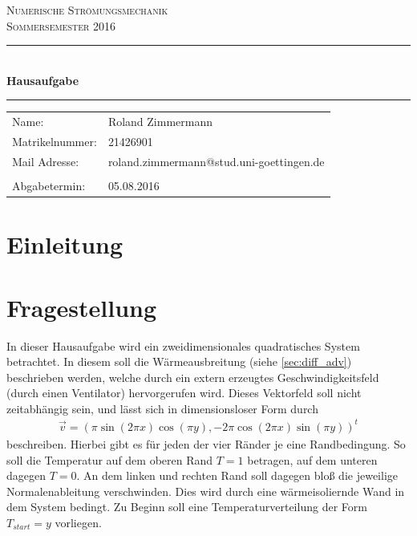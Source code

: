 \documentclass[12pt,a4paper,titlepage,headinclude,bibtotoc]{scrartcl}
\begin{document}
\begin{titlepage}
\centering
\textsc{\Large Numerische Strömungsmechanik\\
[1.5ex] Sommersemester 2016}

\vspace*{4.2cm}

\rule{\textwidth}{1pt}\\[0.5cm]
{\huge \bfseries
  Hausaufgabe\\[1.5ex]}
\rule{\textwidth}{1pt}

\vspace*{3.5cm}

\begin{Large}
\begin{tabular}{ll}
Name: & Roland Zimmermann\\
Matrikelnummer:	& 21426901 \\
Mail Adresse: & roland.zimmermann@stud.uni-goettingen.de \\ 
\\
Abgabetermin: & 05.08.2016\\
\end{tabular}
\end{Large}

\end{titlepage}



\tableofcontents

\newpage

\section{Einleitung}
\label{sec:einleitung}

\section{Fragestellung}
\label{sec:fragestellung}
In dieser Hausaufgabe wird ein zweidimensionales quadratisches System betrachtet. In diesem soll die Wärmeausbreitung (siehe \ref{sec:diff_adv}) beschrieben werden, welche durch ein extern erzeugtes Geschwindigkeitsfeld (durch einen Ventilator) hervorgerufen wird. Dieses Vektorfeld soll nicht zeitabhängig sein, und lässt sich in dimensionsloser Form durch
\begin{align*}
\vec{v} = (\pi \sin(2\pi x) \cos(\pi y), -2 \pi \cos(2\pi x) \sin(\pi y))^t
\end{align*}
beschreiben. Hierbei gibt es für jeden der vier Ränder je eine Randbedingung. So soll die Temperatur auf dem oberen Rand $T=1$ betragen, auf dem unteren dagegen $T=0$. An dem linken und rechten Rand soll dagegen bloß die jeweilige Normalenableitung verschwinden. Dies wird durch eine wärmeisoliernde Wand in dem System bedingt. Zu Beginn soll eine Temperaturverteilung der Form $T_{start} = y$ vorliegen.\\
\end{document}
